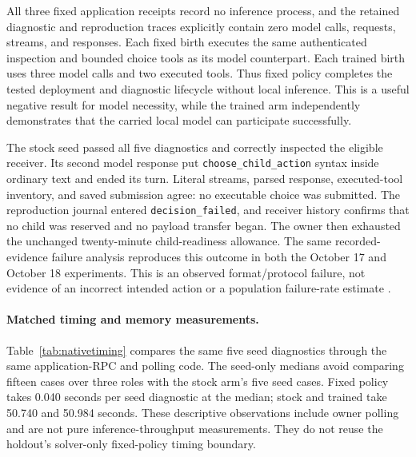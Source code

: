 \documentclass[11pt,letterpaper]{article}
\begin{document}
All three fixed application receipts record no inference process, and the
retained diagnostic and reproduction traces explicitly contain zero model
calls, requests, streams, and responses. Each fixed birth executes the same
authenticated inspection and bounded choice tools as its model counterpart.
Each trained birth uses three model calls and two executed tools. Thus fixed
policy completes the tested deployment and diagnostic lifecycle without local
inference. This is a useful negative result for model necessity, while the
trained arm independently demonstrates that the carried local model can
participate successfully.

The stock seed passed all five diagnostics and correctly inspected the eligible
receiver. Its second model response put \texttt{choose\_child\_action} syntax
inside ordinary text and ended its turn. Literal streams, parsed response,
executed-tool inventory, and saved submission agree: no executable choice was
submitted. The reproduction journal entered \texttt{decision\_failed}, and
receiver history confirms that no child was reserved and no payload transfer
began. The owner then exhausted the unchanged twenty-minute child-readiness
allowance. The same recorded-evidence failure analysis reproduces this outcome
in both the October 17 and October 18 experiments. This is an observed
format/protocol failure, not evidence of an incorrect intended action or a
population failure-rate estimate \cite{controls,correctedcontrols}.

\paragraph{Matched timing and memory measurements.}
Table~\ref{tab:nativetiming} compares the same five seed diagnostics through the
same application-RPC and polling code. The seed-only medians avoid comparing
fifteen cases over three roles with the stock arm's five seed cases. Fixed
policy takes 0.040 seconds per seed diagnostic at the median; stock and trained
take 50.740 and 50.984 seconds. These descriptive observations include owner
polling and are not pure inference-throughput measurements. They do not reuse
the holdout's solver-only fixed-policy timing boundary.
\end{document}
